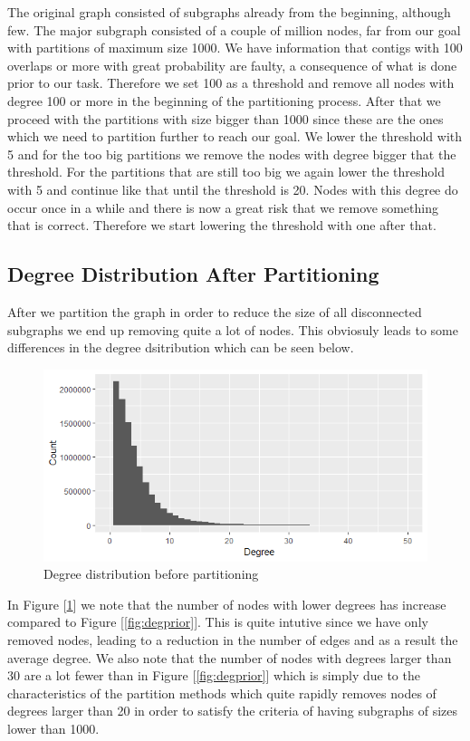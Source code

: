 \documentclass[a4paper,10pt]{article}
\newcommand\bref[1]{[\ref{#1}]}
\begin{document}
The original graph consisted of subgraphs already from the beginning, although few. The major subgraph consisted of a couple of million
nodes, far from our goal with partitions of maximum size 1000. We have information that contigs with 100 overlaps or more with great
probability are faulty, a consequence of what is done prior to our task. Therefore we set 100 as a threshold and remove all nodes with
degree 100 or more in the beginning of the partitioning process. After that we proceed with the partitions with size bigger than 1000
since these are the ones which we need to partition further to reach our goal. We lower the threshold with 5 and for the too big
partitions we remove the nodes with degree bigger that the threshold. For the partitions that are still too big we again lower the
threshold with 5 and continue like that until the threshold is 20. Nodes with this degree do occur once in a while and there is now a
great risk that we remove something that is correct. Therefore we start lowering the threshold with one after that.



\subsection{Degree Distribution After Partitioning}

After we partition the graph in order to reduce the size of all disconnected subgraphs we end up removing quite a lot of nodes. This obviosuly leads to some differences in the degree dsitribution which can be seen below.

\begin{figure}[H]
	\centering
	\includegraphics[width=0.85\linewidth]{degreesafter.png}
	\caption{Degree distribution before partitioning}
	\label{fig:degafter}
\end{figure}

In Figure \bref{fig:degafter} we note that the number of nodes with lower degrees has increase compared to Figure \bref{fig:degprior}. This is quite intutive since we have only removed nodes, leading to a reduction in the number of edges and as a result the average degree. We also note that the number of nodes with degrees larger than 30 are a lot fewer than in Figure \bref{fig:degprior} which is simply due to the characteristics of the partition methods which quite rapidly removes nodes of degrees larger than 20 in order to satisfy the criteria of having subgraphs of sizes lower than 1000.
\end{document}
